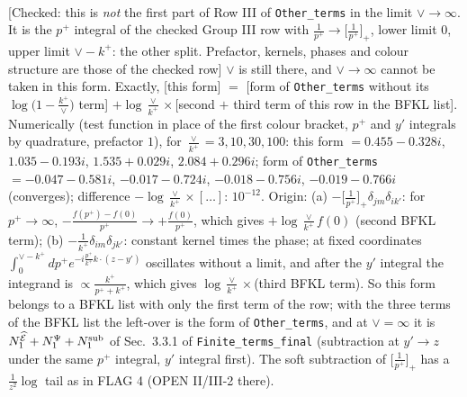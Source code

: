 \documentclass[9pt]{article}
\numberwithin{equation}{section}
\begin{document}
\begin{align}
\end{align} {\color{red}[Checked: this is \emph{not} the first part of Row III of \texttt{Other\_terms} in the limit $\vee\to\infty$. It is the $p^{+}$ integral of the checked Group III row with $\frac{1}{p^{+}}\to\big[\frac{1}{p^{+}}\big]_{+}$, lower limit $0$, upper limit $\vee-k^{+}$: the other split. Prefactor, kernels, phases and colour structure are those of the checked row]} {\color{magenta} $\vee$ is still there, and $\vee\to\infty$ cannot be taken in this form. Exactly, [this form] $=$ [form of \texttt{Other\_terms} without its $\log\big(1-\frac{k^{+}}{\vee}\big)$ term] $+\log\frac{\vee}{k^{+}}\times$[second $+$ third term of this row in the BFKL list]. Numerically (test function in place of the first colour bracket, $p^{+}$ and $y'$ integrals by quadrature, prefactor $1$), for $\frac{\vee}{k^{+}}=3,10,30,100$: this form $=0.455-0.328i$, $1.035-0.193i$, $1.535+0.029i$, $2.084+0.296i$; form of \texttt{Other\_terms} $=-0.047-0.581i$, $-0.017-0.724i$, $-0.018-0.756i$, $-0.019-0.766i$ (converges); difference $-\log\frac{\vee}{k^{+}}\times[\dots]$: $10^{-12}$. Origin: (a) $-\big[\frac{1}{p^{+}}\big]_{+}\delta_{jm}\delta_{ik'}$: for $p^{+}\to\infty$, $-\frac{f(p^{+})-f(0)}{p^{+}}\to+\frac{f(0)}{p^{+}}$, which gives $+\log\frac{\vee}{k^{+}}f(0)$ (second BFKL term); (b) $-\frac{1}{k^{+}}\delta_{im}\delta_{jk'}$: constant kernel times the phase; at fixed coordinates $\int_{0}^{\vee-k^{+}}dp^{+}e^{-i\frac{p^{+}}{k^{+}}k\cdot(z-y')}$ oscillates without a limit, and after the $y'$ integral the integrand is $\propto\frac{k^{+}}{p^{+}+k^{+}}$, which gives $\log\frac{\vee}{k^{+}}\times$(third BFKL term). So this form belongs to a BFKL list with only the first term of the row; with the three terms of the BFKL list the left-over is the form of \texttt{Other\_terms}, and at $\vee=\infty$ it is $N_{1}^{\widehat{\mathcal{E}}}+N_{1}^{\Psi}+N_{1}^{\rm sub}$ of Sec.~3.3.1 of \texttt{Finite\_terms\_final} (subtraction at $y'\to z$ under the same $p^{+}$ integral, $y'$ integral first). The soft subtraction of $\big[\frac{1}{p^{+}}\big]_{+}$ has a $\frac{1}{z^{2}}\log$ tail as in FLAG 4 (OPEN II/III-2 there).}\par\noindent
\end{document}
